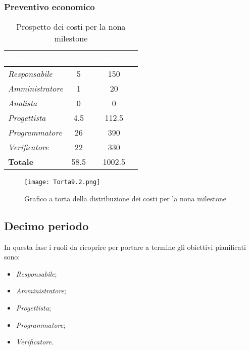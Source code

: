 \newpage
\subsubsection{Preventivo economico}

\begin{table}[H]
    \renewcommand\arraystretch{1.5}
    \centering
    \begin{tabular}{|l|c|c|}
    \hline
    \rowcolor[HTML]{036400}
    \textcolor{white}{\textbf{Ruolo}} & \multicolumn{1}{l|}{\textcolor{white}{\textbf{Ore}}} & \multicolumn{1}{l|}{\textcolor{white}{\textbf{Costo (€)}}} \\ \hline
    \rowcolor[HTML]{EFEFEF}\textit{Responsabile}   & 5    & 150    \\ \hline
    \rowcolor[HTML]{C0C0C0}\textit{Amministratore} & 1    & 20     \\ \hline
    \rowcolor[HTML]{EFEFEF}\textit{Analista}       & 0    & 0      \\ \hline
    \rowcolor[HTML]{C0C0C0}\textit{Progettista}    & 4.5  & 112.5  \\ \hline
    \rowcolor[HTML]{EFEFEF}\textit{Programmatore}  & 26   & 390    \\ \hline
    \rowcolor[HTML]{C0C0C0}\textit{Verificatore}   & 22   & 330    \\ \hline
    \rowcolor[HTML]{EFEFEF}\textbf{Totale}         & 58.5 & 1002.5 \\ \hline
    \end{tabular}
    \caption{Prospetto dei costi per la nona milestone}
\end{table}

\begin{figure}[H]
    \texttt{[image: Torta9.2.png]}
    \caption{Grafico a torta della distribuzione dei costi per la nona milestone}
\end{figure}

\subsection{Decimo periodo}

In questa fase i ruoli da ricoprire per portare a termine gli obiettivi pianificati sono:
\begin{itemize}
    \item \textit{Responsabile};
    \item \textit{Amministratore};
    \item \textit{Progettista};
    \item \textit{Programmatore};
    \item \textit{Verificatore}.
\end{itemize}


